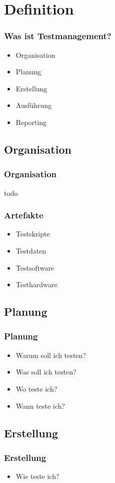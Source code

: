 \section{Definition}
\begin{frame}
	\frametitle{Was ist Testmanagement?}
	\begin{itemize}
		\item Organisation
		\item Planung
		\item Erstellung
		\item Ausf\"uhrung
		\item Reporting
	\end{itemize}
\end{frame}

\subsection{Organisation}
\begin{frame}
	\frametitle{Organisation}
	todo
\end{frame}

\begin{frame}
	\frametitle{Artefakte}
	\begin{itemize}
		\item Testskripte
		\item Testdaten
		\item Testsoftware
		\item Testhardware
	\end{itemize}
\end{frame}

\subsection{Planung}
\begin{frame}
	\frametitle{Planung}
	\begin{itemize}
		\item Warum soll ich testen?
		\item Was soll ich testen?
		\item Wo teste ich?
		\item Wann teste ich?
	\end{itemize}
\end{frame}

\subsection{Erstellung}
\begin{frame}
	\frametitle{Erstellung}
	\begin{itemize}
		\item Wie teste ich?
	\end{itemize}
\end{frame}

